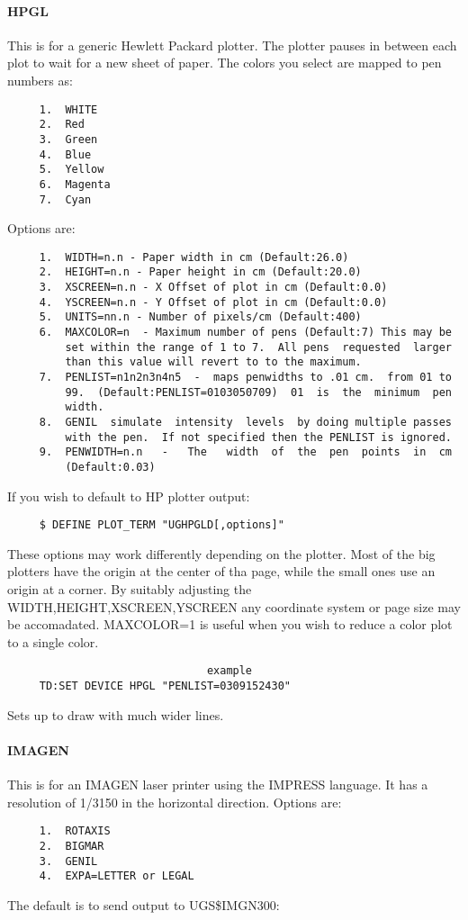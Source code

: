 \paragraph{HPGL}
This is for a generic Hewlett Packard plotter.  The plotter pauses in
between each plot to wait for a new sheet of paper.  The  colors  you
select are mapped to pen numbers as:  
\begin{verbatim}
     1.  WHITE 
     2.  Red 
     3.  Green 
     4.  Blue 
     5.  Yellow 
     6.  Magenta 
     7.  Cyan 
\end{verbatim}
Options are:  
\begin{verbatim}
     1.  WIDTH=n.n - Paper width in cm (Default:26.0) 
     2.  HEIGHT=n.n - Paper height in cm (Default:20.0) 
     3.  XSCREEN=n.n - X Offset of plot in cm (Default:0.0) 
     4.  YSCREEN=n.n - Y Offset of plot in cm (Default:0.0) 
     5.  UNITS=nn.n - Number of pixels/cm (Default:400) 
     6.  MAXCOLOR=n  - Maximum number of pens (Default:7) This may be
         set within the range of 1 to 7.  All pens  requested  larger
         than this value will revert to to the maximum.  
     7.  PENLIST=n1n2n3n4n5  -  maps penwidths to .01 cm.  from 01 to
         99.  (Default:PENLIST=0103050709)  01  is  the  minimum  pen
         width.  
     8.  GENIL  simulate  intensity  levels  by doing multiple passes
         with the pen.  If not specified then the PENLIST is ignored. 
     9.  PENWIDTH=n.n   -   The   width  of  the  pen  points  in  cm
         (Default:0.03) 
\end{verbatim}
If you wish to default to HP plotter output:  
\begin{verbatim}
     $ DEFINE PLOT_TERM "UGHPGLD[,options]" 
\end{verbatim}

These options may work differently depending on the plotter.  Most of
the big plotters have the origin at the center of tha page, while the
small  ones  use  an  origin  at a corner.  By suitably adjusting the
WIDTH,HEIGHT,XSCREEN,YSCREEN any coordinate system or page  size  may
be accomadated.  MAXCOLOR=1 is useful when you wish to reduce a color
plot to a single color.  

\begin{verbatim}
                               example
     TD:SET DEVICE HPGL "PENLIST=0309152430" 
\end{verbatim}
Sets up to draw with much wider lines.  
\paragraph{IMAGEN}
This  is  for an IMAGEN laser printer using the IMPRESS language.  It
has a resolution of 1/3150 in the horizontal direction.  Options are: 
\begin{verbatim}
     1.  ROTAXIS 
     2.  BIGMAR 
     3.  GENIL 
     4.  EXPA=LETTER or LEGAL 
\end{verbatim}
The default is to send output to UGS\$IMGN300:  
